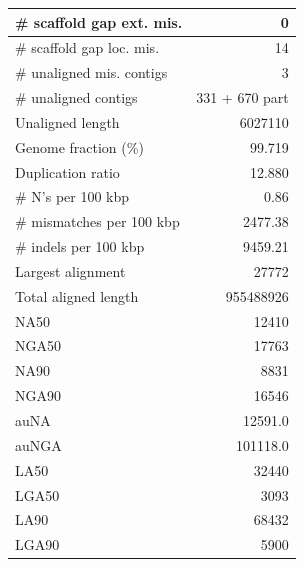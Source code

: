 \documentclass[12pt,a4paper]{article}
\begin{document}
\begin{table}[ht]
\begin{center}
\begin{tabular}{|l*{1}{|r}|}
\# scaffold gap ext. mis. & 0 \\ \hline
\# scaffold gap loc. mis. & 14 \\ \hline
\# unaligned mis. contigs & 3 \\ \hline
\# unaligned contigs & 331 + 670 part \\ \hline
Unaligned length & 6027110 \\ \hline
Genome fraction (\%) & 99.719 \\ \hline
Duplication ratio & 12.880 \\ \hline
\# N's per 100 kbp & 0.86 \\ \hline
\# mismatches per 100 kbp & 2477.38 \\ \hline
\# indels per 100 kbp & 9459.21 \\ \hline
Largest alignment & 27772 \\ \hline
Total aligned length & 955488926 \\ \hline
NA50 & 12410 \\ \hline
NGA50 & 17763 \\ \hline
NA90 & 8831 \\ \hline
NGA90 & 16546 \\ \hline
auNA & 12591.0 \\ \hline
auNGA & 101118.0 \\ \hline
LA50 & 32440 \\ \hline
LGA50 & 3093 \\ \hline
LA90 & 68432 \\ \hline
LGA90 & 5900 \\ \hline
\end{tabular}
\end{center}
\end{table}
\end{document}
